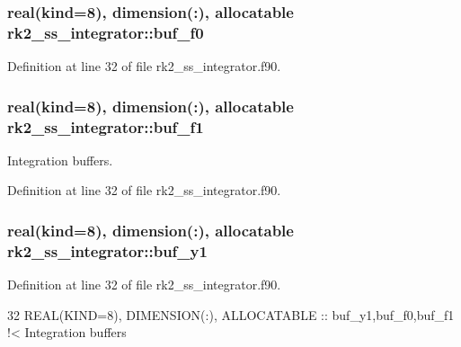 \subsubsection[{\texorpdfstring{buf\+\_\+f0}{buf_f0}}]{\setlength{\rightskip}{0pt plus 5cm}real(kind=8), dimension(\+:), allocatable rk2\+\_\+ss\+\_\+integrator\+::buf\+\_\+f0\hspace{0.3cm}{\ttfamily [private]}}\hypertarget{namespacerk2__ss__integrator_aebce0ce5ca95ff293f219a8f85d44851}{}\label{namespacerk2__ss__integrator_aebce0ce5ca95ff293f219a8f85d44851}


Definition at line 32 of file rk2\+\_\+ss\+\_\+integrator.\+f90.

\subsubsection[{\texorpdfstring{buf\+\_\+f1}{buf_f1}}]{\setlength{\rightskip}{0pt plus 5cm}real(kind=8), dimension(\+:), allocatable rk2\+\_\+ss\+\_\+integrator\+::buf\+\_\+f1\hspace{0.3cm}{\ttfamily [private]}}\hypertarget{namespacerk2__ss__integrator_a1ffae309b7f72f07c598ab1882634ab3}{}\label{namespacerk2__ss__integrator_a1ffae309b7f72f07c598ab1882634ab3}


Integration buffers. 



Definition at line 32 of file rk2\+\_\+ss\+\_\+integrator.\+f90.

\subsubsection[{\texorpdfstring{buf\+\_\+y1}{buf_y1}}]{\setlength{\rightskip}{0pt plus 5cm}real(kind=8), dimension(\+:), allocatable rk2\+\_\+ss\+\_\+integrator\+::buf\+\_\+y1\hspace{0.3cm}{\ttfamily [private]}}\hypertarget{namespacerk2__ss__integrator_a8b6b195712dd95f7eafe269379aa9dcc}{}\label{namespacerk2__ss__integrator_a8b6b195712dd95f7eafe269379aa9dcc}


Definition at line 32 of file rk2\+\_\+ss\+\_\+integrator.\+f90.


\begin{DoxyCode}
32   \textcolor{keywordtype}{REAL(KIND=8)}, \textcolor{keywordtype}{DIMENSION(:)}, \textcolor{keywordtype}{ALLOCATABLE} :: buf\_y1,buf\_f0,buf\_f1\textcolor{comment}{ !< Integration buffers}
\end{DoxyCode}
